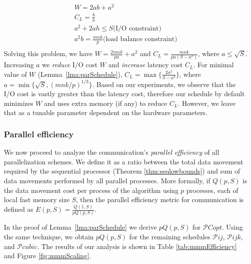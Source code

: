 \documentclass[sigplan,review,anonymous]{acmart}\settopmatter{printfolios=true,printccs=false,printacmref=false}
\begin{document}
\begin{multline}
\\
W = 2ab + a^2 \\
C_L = \frac{b}{h} \\
a^2 + 2ah \le S \text{(I/O constraint)} \\
a^2b = \frac{mnk}{p} \text{(load balance constraint)} \\
\end{multline}
Solving this problem, we have $W = \frac{2mnk}{pa} + a^2$ and $C_L 
= 
\frac{mnk}{pa(S-a^2)}$, 
where $a \le \sqrt{S}$. Increasing $a$ we \emph{reduce} I/O cost 
$W$ and \emph{increase} latency cost $C_L$. For minimal value of 
$W$ (Lemma~\ref{lma:parSchedule}),  $C_L = \max\{\frac{2a^2}{S - 
a^2}\}$, where $a = \min\{\sqrt{S}, (mnk/p)^{1/3} \}$. Based on our 
experiments, we observe that the I/O cost is vastly greater than the 
latency cost, therefore our schedule by default minimizes $W$ and uses 
extra memory (if any) to reduce $C_L$. However, we leave that as a tunable 
parameter dependent on the hardware parameters.

\subsubsection{Parallel efficiency} 
We now proceed to analyze the 
communication's 
\emph{parallel efficiency} of all parallelization schemes. We define it as a 
ratio between  
the total data movement required by the sequential processor (Theorem 
\ref{thm:seqlowbounds}) and sum of data movements performed by all 
parallel
processes. More 
formally, if $Q(p,S)$ is the data movement cost per process of the 
algorithm 
using $p$ 
processes, each of local fast memory size $S$, then the parallel 
efficiency 
metric for communication is defined as $E(p,S) = 
\frac{Q(1,S)}{pQ(p,S)}$.

In the proof of Lemma~\ref{lma:parSchedule} we derive $pQ(p,S)$ for 
$\mathcal{P}Copt$. Using the same technique, we obtain $pQ(p,S)$ for the 
remaining schedules $\mathcal{P}ij$, $\mathcal{P}ijk$, and $\mathcal{P}cubic$.
The results of our analysis is shown in Table \ref{tab:mmmEfficiency} 
and 
Figure \ref{fig:mmmScaling}.
\end{document}
